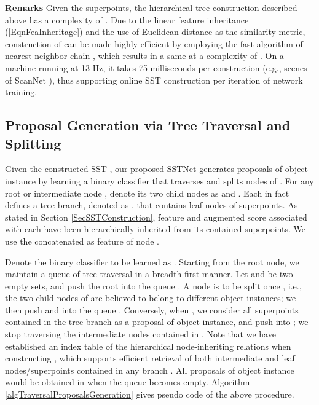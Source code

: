 \documentclass[10pt,twocolumn,letterpaper]{article}
\begin{document}
\noindent\textbf{Remarks} Given the  superpoints, the hierarchical tree construction described above has a complexity of . Due to the linear feature inheritance (\ref{EqnFeaInheritage}) and the use of Euclidean distance as the similarity metric, construction of  can be made highly efficient by employing the fast algorithm of nearest-neighbor chain \cite{mullner2011modern}, which results in a same  at a complexity of . On a machine running at 13 Hz, it takes  75 milliseconds per construction (e.g., scenes of ScanNet \cite{dai2017scannet}), thus supporting online SST construction per iteration of network training.



\subsection{Proposal Generation via Tree Traversal and Splitting}
\label{SecProposalGenViaTreeTraversal}

Given the constructed SST , our proposed SSTNet generates proposals of object instance by learning a binary classifier that traverses and splits nodes of . For any root or intermediate node , denote its two child nodes as  and . Each  in fact defines a tree branch, denoted as , that contains leaf nodes of superpoints. As stated in Section \ref{SecSSTConstruction}, feature  and augmented score  associated with each  have been hierarchically inherited from its contained superpoints. We use the concatenated  as feature of node .

Denote the binary classifier to be learned as . Starting from the root node, we maintain a queue of tree traversal in a breadth-first manner. Let  and  be two empty sets, and push the root into the queue . A node  is to be split once  , i.e., the two child nodes of  are believed to belong to different object instances; we then push  and  into the queue . Conversely, when , we consider all superpoints contained in the tree branch  as a proposal of object instance, and push  into ; we stop traversing the intermediate nodes contained in . Note that we have established an index table of the hierarchical node-inheriting relations when constructing , which supports efficient retrieval of both intermediate and leaf nodes/superpoints contained in any branch . All proposals of object instance would be obtained in  when the queue  becomes empty. Algorithm \ref{algTraversalProposalsGeneration} gives pseudo code of the above procedure.
\end{document}
